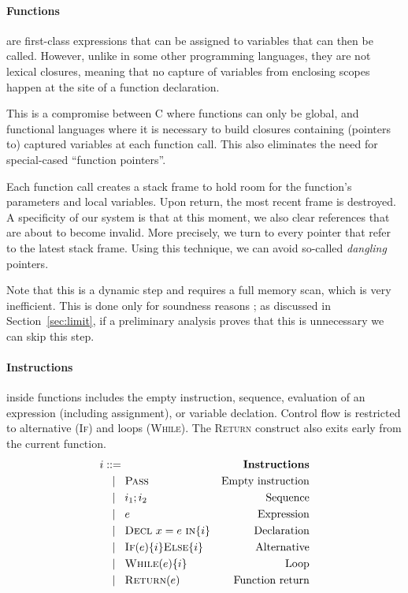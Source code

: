 \paragraph{Functions} are first-class expressions that can be assigned to
variables that can then be called. However, unlike in some other programming
languages, they are not lexical closures, meaning that no capture of variables
from enclosing scopes happen at the site of a function declaration.

This is a compromise between C where functions can only be global, and
functional languages where it is necessary to build closures containing (pointers
to) captured variables at each function call. This also eliminates the need for
special-cased ``function pointers''.

Each function call creates a stack frame to hold room for the function's
parameters and local variables. Upon return, the most recent frame is destroyed.
A specificity of our system is that at this moment, we also clear references
that are about to become invalid. More precisely, we turn to \eNull every
pointer that refer to the latest stack frame. Using this technique, we can avoid
so-called \emph{dangling} pointers.

Note that this is a dynamic step and requires a full memory scan, which is very
inefficient. This is done only for soundness reasons ; as discussed in
Section~\ref{sec:limit}, if a preliminary analysis proves that this is
unnecessary we can skip this step.

\paragraph{Instructions} inside functions includes the empty instruction,
sequence, evaluation of an expression (including assignment), or variable
declation. Control flow is restricted to alternative (\textsc{If}) and loops
(\textsc{While}). The \textsc{Return} construct also exits early from the
current function.
{ \small \begin{align*}
  \gramdefshort{Instructions}{i}
                 { \iPass          }{Empty instruction}
                 { i_1;i_2         }{Sequence}
                 { e               }{Expression}
                 { \iDecl{x}{e}{i} }{Declaration}
                 { \iIf{e}{i}{i}   }{Alternative}
                 { \iWhile{e}{i}   }{Loop}
                 { \iReturn{e}     }{Function return}
                 {END}
\end{align*}}
\vspace{-5mm}
